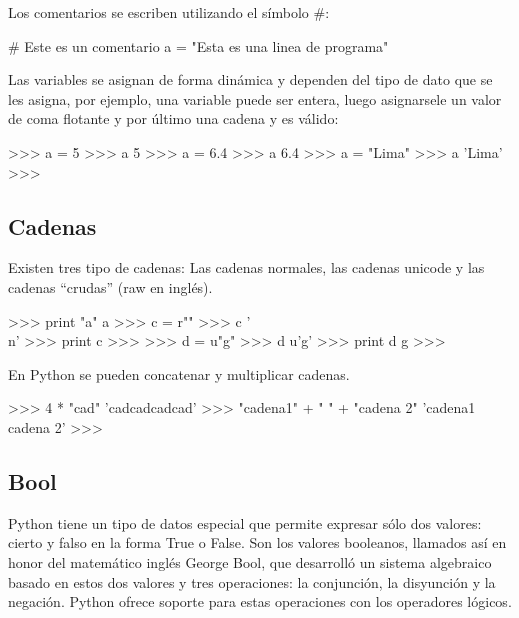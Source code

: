Los comentarios se escriben utilizando el símbolo \#:\\

\begin{pyglist} [language=python]
# Este es un comentario
a = "Esta es una linea de programa"
\end{pyglist}

Las variables se asignan de forma dinámica y dependen del tipo de dato que se les asigna, por ejemplo, una variable puede ser entera, luego asignarsele un valor de coma flotante y por último una cadena y es válido:\\

\begin{pyglist} [language=python]
>>> a = 5
>>> a
5
>>> a = 6.4
>>> a
6.4
>>> a = "Lima"
>>> a
'Lima'
>>> 
\end{pyglist}

\subsection{Cadenas}

Existen tres tipo de cadenas: Las cadenas normales, las cadenas unicode y las cadenas ``crudas'' (raw en inglés).\\

\begin{pyglist} [language=python]
>>> print "a"  
a              
>>> c = r"\n"        
>>> c                          
'\\n'    
>>> print c                     
\n   
>>>      
>>> d = u"g"
>>> d
u'g'
>>> print d
g
>>>     
\end{pyglist}

En Python se pueden concatenar y multiplicar cadenas.\\

\begin{pyglist} [language=python]
>>> 4 * "cad"
'cadcadcadcad'
>>> "cadena1" + " " + "cadena 2"
'cadena1 cadena 2'
>>> 
\end{pyglist}


\subsection{Bool}

Python tiene un tipo de datos especial que permite expresar sólo dos valores: cierto y falso en la forma True o False. Son los valores booleanos, llamados así en honor del matemático inglés George Bool, que desarrolló un sistema algebraico basado en estos dos valores y tres operaciones: la conjunción, la disyunción y la negación. Python ofrece soporte para estas operaciones con los operadores lógicos.\\

